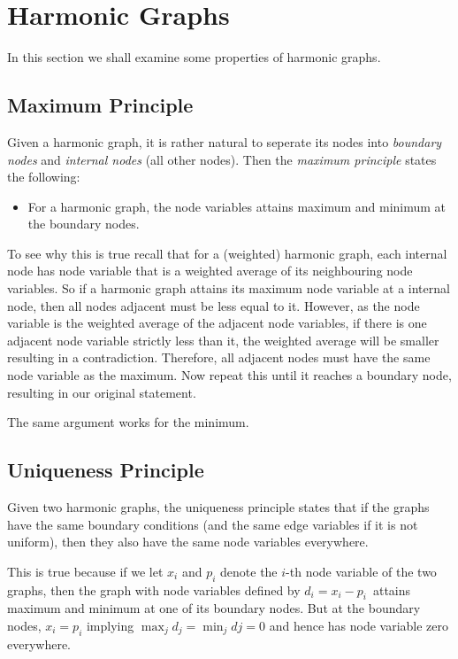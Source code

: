 \documentclass[]{article}
\providecommand{\tightlist}{%
  \setlength{\itemsep}{0pt}\setlength{\parskip}{0pt}}
\begin{document}
\newpage

\section{Harmonic Graphs}\label{harmonic-graphs}

In this section we shall examine some properties of harmonic graphs.

\subsection{Maximum Principle}\label{maximum-principle}

Given a harmonic graph, it is rather natural to seperate its nodes into
\emph{boundary nodes} and \emph{internal nodes} (all other nodes). Then
the \emph{maximum principle} states the following:

\begin{itemize}
\tightlist
\item
  For a harmonic graph, the node variables attains maximum and minimum
  at the boundary nodes.
\end{itemize}

To see why this is true recall that for a (weighted) harmonic graph,
each internal node has node variable that is a weighted average of its
neighbouring node variables. So if a harmonic graph attains its maximum
node variable at a internal node, then all nodes adjacent must be less
equal to it. However, as the node variable is the weighted average of
the adjacent node variables, if there is one adjacent node variable
strictly less than it, the weighted average will be smaller resulting in
a contradiction. Therefore, all adjacent nodes must have the same node
variable as the maximum. Now repeat this until it reaches a boundary
node, resulting in our original statement.

The same argument works for the minimum.

\subsection{Uniqueness Principle}\label{uniqueness-principle}

Given two harmonic graphs, the uniqueness principle states that if the
graphs have the same boundary conditions (and the same edge variables if
it is not uniform), then they also have the same node variables
everywhere.

This is true because if we let \(x_i\) and \(p_i\) denote the \(i\)-th
node variable of the two graphs, then the graph with node variables
defined by \(d_i = x_i - p_i\)~attains maximum and minimum at one of its
boundary nodes. But at the boundary nodes, \(x_i = p_i\) implying
\(\max_j d_j = \min_j dj = 0\) and hence has node variable zero
everywhere.
\end{document}
